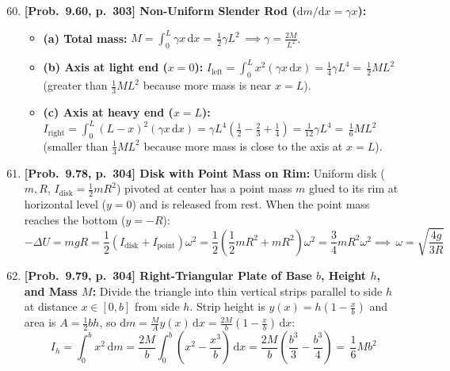 \documentclass[11pt,a4paper,openany,oneside]{book}
\newcommand{\eqbox}[1]{\boxed{\,#1\,}}
\newcommand{\dd}{\,\mathrm{d}}
\newcommand{\diff}{\mathrm{d}}
\numberwithin{equation}{chapter}
\begin{document}
\begin{enumerate}[label=\textbf{Prob.\ 9.\arabic*},leftmargin=4.2em]
  \setcounter{enumi}{59}
  \item \textbf{[Prob.\ 9.60, p.\ 303] Non-Uniform Slender Rod ($\diff m/\diff x = \gamma x$):}
  \begin{itemize}
    \item \textbf{(a) Total mass:} $M = \int_0^L \gamma x\dd x = \eqbox{\frac{1}{2}\gamma L^2} \implies \gamma = \frac{2M}{L^2}$.
    \item \textbf{(b) Axis at light end ($x=0$):} $I_{\text{left}} = \int_0^L x^2(\gamma x\dd x) = \frac{1}{4}\gamma L^4 = \eqbox{\frac{1}{2}ML^2}$ (greater than $\frac{1}{3}ML^2$ because more mass is near $x=L$).
    \item \textbf{(c) Axis at heavy end ($x=L$):} $I_{\text{right}} = \int_0^L (L-x)^2(\gamma x\dd x) = \gamma L^4\!\left(\frac{1}{2} - \frac{2}{3} + \frac{1}{4}\right) = \frac{1}{12}\gamma L^4 = \eqbox{\frac{1}{6}ML^2}$ (smaller than $\frac{1}{3}ML^2$ because more mass is close to the axis at $x=L$).
  \end{itemize}

  \item \textbf{[Prob.\ 9.78, p.\ 304] Disk with Point Mass on Rim:}
  Uniform disk ($m, R$, $I_{\text{disk}} = \frac{1}{2}mR^2$) pivoted at center has a point mass $m$ glued to its rim at horizontal level ($y=0$) and is released from rest. When the point mass reaches the bottom ($y = -R$):
  \begin{equation*}
    -\Delta U = mgR = \frac{1}{2}(I_{\text{disk}} + I_{\text{point}})\omega^2 = \frac{1}{2}\!\left(\frac{1}{2}mR^2 + mR^2\right)\omega^2 = \frac{3}{4}mR^2\omega^2 \implies \eqbox{\omega = \sqrt{\frac{4g}{3R}}}
  \end{equation*}

  \item \textbf{[Prob.\ 9.79, p.\ 304] Right-Triangular Plate of Base $b$, Height $h$, and Mass $M$:}
  Divide the triangle into thin vertical strips parallel to side $h$ at distance $x\in [0,b]$ from side $h$. Strip height is $y(x) = h\!\left(1 - \frac{x}{b}\right)$ and area is $A = \frac{1}{2}bh$, so $\diff m = \frac{M}{A}y(x)\dd x = \frac{2M}{b}\!\left(1 - \frac{x}{b}\right)\dd x$:
  \begin{equation*}
    I_h = \int_0^b x^2\dd m = \frac{2M}{b}\int_0^b \left(x^2 - \frac{x^3}{b}\right)\dd x = \frac{2M}{b}\!\left(\frac{b^3}{3} - \frac{b^3}{4}\right) = \eqbox{\frac{1}{6}Mb^2}
  \end{equation*}


\end{enumerate}
\end{document}
